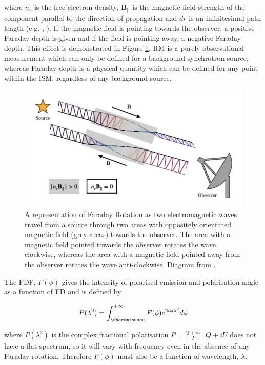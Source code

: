 where $n_e$ is the free electron density, $\boldsymbol{B_{||}}$ is the magnetic field strength of the component parallel to the direction of propagation and $dr$ is an infinitesimal path length (e.g. \cite{burn_1966}, \cite{correct_sense_of_faraday_rotation}). If the magnetic field is pointing towards the observer, a positive Faraday depth is given and if the field is pointing away, a negative Faraday depth. This effect is demonstrated in Figure \ref{fig:faraday rotation diagram}. RM is a purely observational measurement which can only be defined for a background synchrotron source, whereas Faraday depth is a physical quantity which can be defined for any point within the ISM, regardless of any background source.


\begin{figure}
    \centering
    \includegraphics[width=0.8\linewidth]{Thesis_Template/Figures/Faraday_rot_diagram.png}
    \caption{A representation of Faraday Rotation as two electromagnetic waves travel from a source through two areas with oppositely orientated magnetic field (grey areas) towards the observer. The area with a magnetic field pointed towards the observer rotates the wave clockwise, whereas the area with a magnetic field pointed away from the observer rotates the wave anti-clockwise. Diagram from \cite{Emma_thesis}.}
    \label{fig:faraday rotation diagram}
\end{figure}

The FDF, $F(\phi)$ gives the intensity of polarised emission and polarisation angle as a function of FD and is defined by 

\begin{equation}
    P(\lambda^2) = \int_{\shortminus\infty}^{+\infty} F(\phi) e^{2i\phi\lambda^2}\space d\phi
    \label{eq: complex FDF}
\end{equation}

where $P(\lambda^2)$ is the complex fractional polarisation $P=\frac{Q+iU}{I}$. $Q+iU$ does not have a flat spectrum, so it will vary with frequency even in the absence of any Faraday rotation. Therefore $F(\phi)$ must also be a function of wavelength, $\lambda$. 

